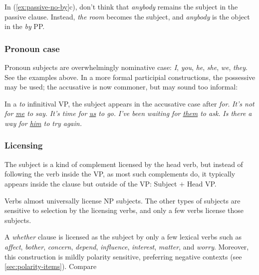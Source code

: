 In (\ref{ex:passive-no-by}c), don't think that \textit{anybody} remains the subject in the passive clause. Instead, \textit{the room} becomes the subject, and \textit{anybody} is the object in the \textit{by} PP.

\subsubsection*{Pronoun case}
Pronoun subjects are overwhelmingly nominative case: \textit{I}, \textit{you}, \textit{he}, \textit{she}, \textit{we}, \textit{they}. See the examples above. In a more formal participial constructions, the possessive may be used; the accusative is now commoner, but may sound too informal:  

\ea
    \z
\z

In a \textit{to} infinitival VP, the subject appears in the accusative case after \textit{for}. \textit{It's not for \uline{me} to say.} \textit{It's time for \uline{us} to go.} \textit{I've been waiting for \uline{them} to ask.} \textit{Is there a way for \uline{him} to try again.}

\subsubsection*{Licensing}
The subject is a kind of complement licensed by the head verb, but instead of following the verb inside the VP, as most such complements do, it typically appears inside the clause but outside of the VP: Subject $+$ Head VP.

Verbs almost universally license NP subjects. The other types of subjects are sensitive to selection by the licensing verbs, and only a few verbs license those subjects.

A \textit{whether} clause is licensed as the subject by only a few lexical verbs such as \textit{affect}, \textit{bother}, \textit{concern}, \textit{depend}, \textit{influence}, \textit{interest}, \textit{matter}, and \textit{worry}. Moreover, this construction is mildly polarity sensitive, preferring negative contexts (see \ref{sec:polarity-items}). Compare 

